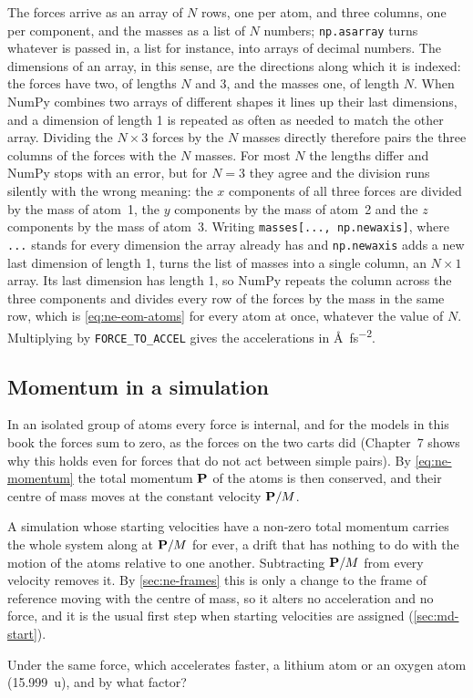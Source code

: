 The forces arrive as an array of $N$ rows, one per atom, and three
columns, one per component, and the masses as a list of $N$ numbers;
\texttt{np.asarray} turns whatever is passed in, a list for instance, into
arrays of decimal numbers. The dimensions of an array, in this sense, are
the directions along which it is indexed: the forces have two, of
lengths $N$ and 3, and the masses one, of length $N$. When NumPy combines two arrays of different
shapes it lines up their last dimensions, and a dimension of length 1 is
repeated as often as needed to match the other array. Dividing the
$N\times3$ forces by the $N$ masses directly therefore pairs the three
columns of the forces with the $N$ masses. For most $N$ the lengths
differ and NumPy stops with an error, but for $N = 3$ they agree and the
division runs silently with the wrong meaning: the $x$ components of all
three forces are divided by the mass of atom~1, the $y$ components by the
mass of atom~2 and the $z$ components by the mass of atom~3. Writing
\texttt{masses[..., np.newaxis]}, where \texttt{...} stands for every
dimension the array already has and \texttt{np.newaxis} adds a new last
dimension of length 1, turns the list of masses into a single column, an
$N\times1$ array. Its last dimension has length 1, so NumPy
repeats the column across the three components and divides every row of
the forces by the mass in the same row, which is \cref{eq:ne-eom-atoms}
for every atom at once, whatever the value of $N$. Multiplying by \texttt{FORCE\_TO\_ACCEL} gives the accelerations in
\si{\angstrom\per\femto\second\squared}.

\subsection*{Momentum in a simulation}

In an isolated group of atoms every force is internal, and for the
models in this book the forces sum to zero, as the forces on the two carts
did (Chapter~7 shows why this holds even for forces that do not act
between simple pairs). By \cref{eq:ne-momentum} the total momentum
$\bm{\mathrm{P}}$ of the atoms is then conserved, and their centre of mass moves at
the constant velocity $\bm{\mathrm{P}}/M$.

\begin{practice}
A simulation whose starting velocities have a non-zero total momentum
carries the whole system along at $\bm{\mathrm{P}}/M$ for ever, a drift that has
nothing to do with the motion of the atoms relative to one another.
Subtracting $\bm{\mathrm{P}}/M$ from every velocity removes it. By
\cref{sec:ne-frames} this is only a change to the frame of reference
moving with the centre of mass, so it alters no acceleration and no
force, and it is the usual first step when starting velocities are
assigned (\cref{sec:md-start}).
\end{practice}


\begin{selfcheck}
Under the same force, which accelerates faster, a lithium atom or an
oxygen atom (\SI{15.999}{\amu}), and by what factor?
\end{selfcheck}
